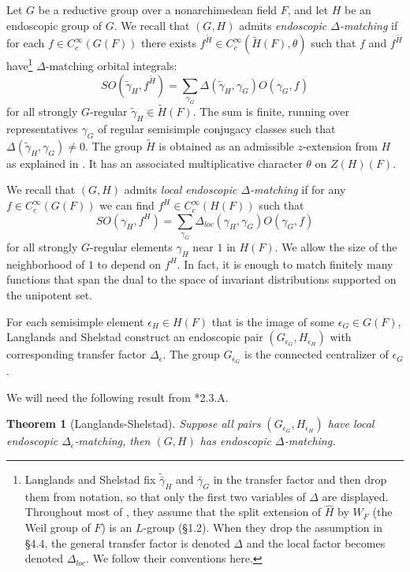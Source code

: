 \documentclass[12pt]{amsart}
\theoremstyle{plain}
\newtheorem{theorem}[thm]{Theorem}
\theoremstyle{definition}
\begin{document}
Let $G$ be a reductive group over a nonarchimedean field $F$,
and let $H$ be an endoscopic group of $G$.  We recall \cite[\S
2.1]{LSd} that $(G,H)$ admits {\it endoscopic $\Delta$-matching} if
for each $f\in C_c^\infty(G(F))$ there exists $f^{\tilde H}\in
C_c^\infty(\tilde H(F),\theta)$ such that $f$ and $f^{\tilde H}$
have\footnote{Langlands and Shelstad fix $\tilde{\bar \gamma}_H$ and
  $\bar\gamma_G$ in the transfer factor and then drop them from
  notation, so that only the first two variables of $\Delta$ are
  displayed.  Throughout most of \cite{LSxf}, they assume that the
  split extension of $\hat H$ by $W_F$ (the Weil group of $F$) is an
  $L$-group (\S1.2).  When they drop the assumption in \S4.4, the
  general transfer factor is denoted $\Delta$ and the local factor
  becomes denoted $\Delta_{loc}$.  We follow their conventions here.}
$\Delta$-matching orbital integrals:
\[
SO(\tilde \gamma_H,f^{\tilde H}) 
 = \sum_{\gamma_G} \Delta(\tilde\gamma_H,\gamma_G)O(\gamma_G,f)
\]
for all strongly $G$-regular $\tilde \gamma_H \in \tilde H(F)$.  The
sum is finite, running over representatives $\gamma_G$ of regular
semisimple conjugacy classes such that
$\Delta(\tilde\gamma_H,\gamma_G)\ne0$.  The group $\tilde H$ is
obtained as an admissible $z$-extension from $H$ as explained in
\cite[\S 4.4]{LSxf}. It has an associated multiplicative character
$\theta$ on $Z(H)(F)$.

We recall that $(G,H)$ admits {\it local endoscopic $\Delta$-matching}
if for any $f\in C_c^\infty(G(F))$ we can find $f^H \in C_c^\infty(H(F))$
such that
\[
SO( \gamma_H,f^{ H}) 
 = \sum_{\gamma_G} \Delta_{loc}(\gamma_H,\gamma_G)O(\gamma_G,f)
\]
for all strongly $G$-regular elements $\gamma_H$ near $1$ in $H(F)$.
We allow the size of the neighborhood of $1$ to depend on $f^H$.
In fact, it is enough to match finitely many functions that span the
dual to the space of invariant distributions supported on the
unipotent set.

For each semisimple element $\epsilon_H \in H(F)$ that is the image of
some $\epsilon_G\in G(F)$, Langlands and Shelstad construct an
endoscopic pair $(G_{\epsilon_G},H_{\epsilon_H})$ with corresponding
transfer factor $\Delta_\epsilon$.  The group $G_{\epsilon_G}$ is the
connected centralizer of $\epsilon_G$.

We will need the following result from \cite{LSd}*{2.3.A}.

\begin{theorem}[Langlands-Shelstad]  Suppose all pairs
  $(G_{\epsilon_G},H_{\epsilon_H})$ have local endoscopic
  $\Delta_\epsilon$-matching, then $(G,H)$ has endoscopic $\Delta$-matching.
\end{theorem}
\end{document}
